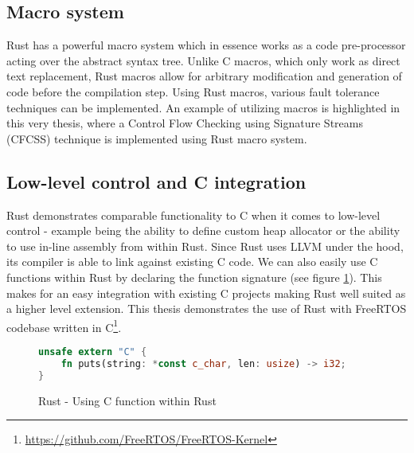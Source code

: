 \subsection{Macro system}
Rust has a powerful macro system which in essence works as a code pre-processor acting over the abstract syntax tree. Unlike C macros, which only work as direct text replacement, Rust macros allow for arbitrary modification and generation of code before the compilation step. Using Rust macros, various fault tolerance techniques can be implemented. An example of utilizing macros is highlighted in this very thesis, where a Control Flow Checking using Signature Streams (CFCSS) technique is implemented using Rust macro system. 

\subsection{Low-level control and C integration}
Rust demonstrates comparable functionality to C when it comes to low-level control - example being the ability to define custom heap allocator or the ability to use in-line assembly from within Rust. Since Rust uses LLVM under the hood, its compiler is able to link against existing C code. We can also easily use C functions within Rust by declaring the function signature (see figure \ref{fig:rust_extern}). This makes for an easy integration with existing C projects making Rust well suited as a higher level extension. This thesis demonstrates the use of Rust with FreeRTOS codebase written in C\footnote{\url{https://github.com/FreeRTOS/FreeRTOS-Kernel}}.

\begin{figure}[!h]
\begin{lstlisting}[language=Rust]
unsafe extern "C" {
    fn puts(string: *const c_char, len: usize) -> i32;
}
\end{lstlisting}
\caption{Rust - Using C function within Rust}
\label{fig:rust_extern}
\end{figure}

